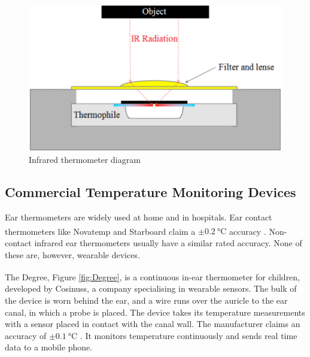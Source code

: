 \medskip

\begin{figure}
   \centering
   \includegraphics[scale=0.5]{figs/IR_Thermometer}
   \caption{Infrared thermometer diagram \citep{irTempSensors}}
   \label{fig:IR_Thermometer}
\end{figure}

\subsection{Commercial Temperature Monitoring Devices}
Ear thermometers are widely used at home and in hospitals. Ear contact thermometers like Novatemp\textsuperscript \textregistered{} and Starboard\textsuperscript \textregistered{} claim a $\pm\SI{0.2}{\celsius}$ accuracy \citep{Novatemp, Starboard}. Non-contact infrared ear thermometers usually have a similar rated accuracy. None of these are, however, wearable devices. 

\medskip
 
The Degree\textsuperscript \textregistered{}, Figure \ref{fig:Degree}, is a continuous in-ear thermometer for children, developed by Cosinuss, a company specialising in wearable sensors. The bulk of the device is worn behind the ear, and a wire runs over the auricle to the ear canal, in which a probe is placed. The device takes its temperature measurements with a sensor placed in contact with the canal wall. The manufacturer claims an accuracy of $\pm\SI{0.1}{\celsius}$ \citep{CosinussDegree}. It monitors temperature continuously and sends real time data to a mobile phone.

\medskip

